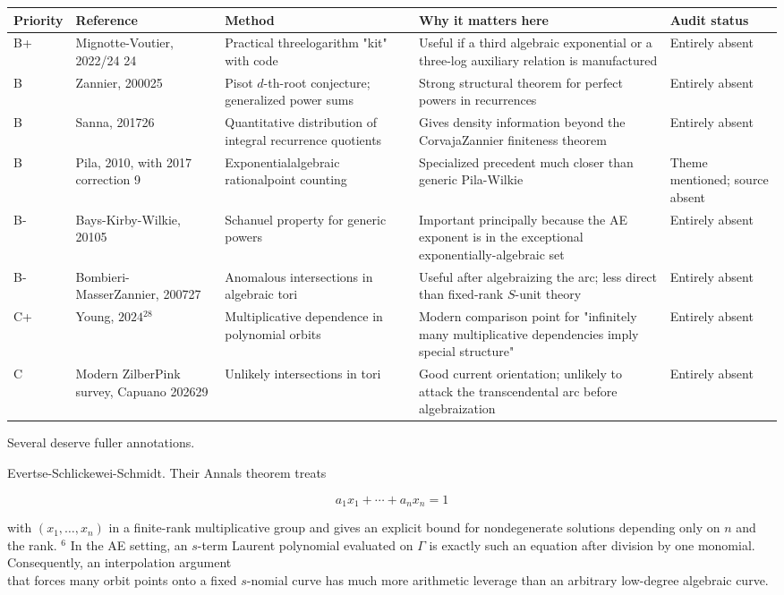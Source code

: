 \documentclass[10pt]{article}
\begin{document}
\begin{center}
\begin{tabular}[t]{|l|l|l|l|l|}
\hline
Priority & Reference & Method & Why it matters here & Audit status \\
\hline
B+ & Mignotte-Voutier, 2022/24 24 & Practical threelogarithm "kit" with code & Useful if a third algebraic exponential or a three-log auxiliary relation is manufactured & Entirely absent \\
\hline
B & Zannier, 200025 & Pisot $d$-th-root conjecture; generalized power sums & Strong structural theorem for perfect powers in recurrences & Entirely absent \\
\hline
B & Sanna, 201726 & Quantitative distribution of integral recurrence quotients & Gives density information beyond the CorvajaZannier finiteness theorem & Entirely absent \\
\hline
B & Pila, 2010, with 2017 correction 9 & Exponentialalgebraic rationalpoint counting & Specialized precedent much closer than generic Pila-Wilkie & Theme mentioned; source absent \\
\hline
B- & Bays-Kirby-Wilkie, 20105 & Schanuel property for generic powers & Important principally because the AE exponent is in the exceptional exponentially-algebraic set & Entirely absent \\
\hline
B- & Bombieri-MasserZannier, 200727 & Anomalous intersections in algebraic tori & Useful after algebraizing the arc; less direct than fixed-rank $S$-unit theory & Entirely absent \\
\hline
C+ & Young, $2024{ }^{28}$ & Multiplicative dependence in polynomial orbits & Modern comparison point for "infinitely many multiplicative dependencies imply special structure" & Entirely absent \\
\hline
C & Modern ZilberPink survey, Capuano 202629 & Unlikely intersections in tori & Good current orientation; unlikely to attack the transcendental arc before algebraization & Entirely absent \\
\hline
\end{tabular}
\end{center}

Several deserve fuller annotations.

Evertse-Schlickewei-Schmidt. Their Annals theorem treats

$$
a_{1} x_{1}+\cdots+a_{n} x_{n}=1
$$

with $\left(x_{1}, \ldots, x_{n}\right)$ in a finite-rank multiplicative group and gives an explicit bound for nondegenerate solutions depending only on $n$ and the rank. ${ }^{6}$ In the AE setting, an $s$-term Laurent polynomial evaluated on $\Gamma$ is exactly such an equation after division by one monomial. Consequently, an interpolation argument\\
that forces many orbit points onto a fixed $s$-nomial curve has much more arithmetic leverage than an arbitrary low-degree algebraic curve.
\end{document}
